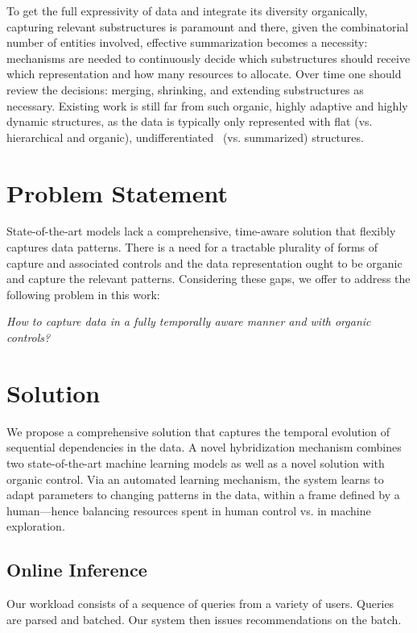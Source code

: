 To get the full expressivity of data and integrate its diversity organically, capturing relevant substructures is paramount and there, given the combinatorial number of entities involved, effective summarization becomes a necessity: mechanisms are needed to continuously decide which substructures should receive which representation and how many resources to allocate. Over time one should review the decisions: merging, shrinking, and extending substructures as necessary. Existing work is still far from such organic, highly adaptive and highly dynamic structures, as the data is typically only represented with flat (vs. hierarchical and organic), undifferentiated~\cite{sun2019bert4rec} (vs. summarized) structures.



\section{Problem Statement}
State-of-the-art models lack a comprehensive, time-aware solution that flexibly captures data patterns. There is a need for a tractable plurality of forms of capture and associated controls and the data representation ought to be organic and capture the relevant patterns.
%
Considering these gaps, we offer to address the following problem in this work:

\emph{
How to capture data in a fully temporally aware manner and with organic controls?}


\section{Solution}
%
We propose a comprehensive solution that captures the temporal evolution of sequential dependencies in the data. A novel hybridization mechanism combines two state-of-the-art machine learning models as well as a novel solution with organic control.
%
Via an automated learning mechanism, the system learns to adapt parameters to changing patterns in the data, within a frame defined by a human---hence balancing resources spent in human control vs. in machine exploration.

\subsection{Online Inference}
Our workload consists of a sequence of queries from a variety of users. Queries are parsed and batched. Our system then issues recommendations on the batch.

